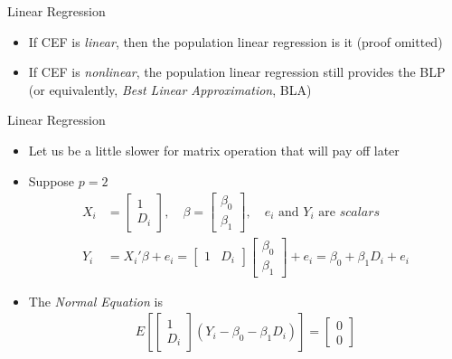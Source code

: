 \documentclass[aspectratio=1610,12pt,xcolor=dvipsnames]{beamer}
\begin{document}
\begin{frame}{Linear Regression}

\begin{itemize}
    \item If CEF is \textit{linear}, then the population linear regression is it (proof omitted)
    \item If CEF is \textit{nonlinear}, the population linear regression still provides the BLP (or equivalently, \textit{Best Linear Approximation}, BLA)
\end{itemize}
    
\end{frame}

\begin{frame}{Linear Regression}
    \begin{itemize}
    \item Let us be a little slower for matrix operation
    that will pay off later
    \item Suppose $p=2$
    \begin{align*}
        X_i &=
    \begin{bmatrix}
    1 \\
    D_{i}
    \end{bmatrix}, \quad
    \beta =
    \begin{bmatrix}
    \beta_0 \\
    \beta_1
    \end{bmatrix}, \quad e_i \text{ and } Y_i \text{ are } \textit{scalars} \\
    Y_i &= X_i'\beta + e_i = \begin{bmatrix}
    1 & D_{i}
    \end{bmatrix} \begin{bmatrix}
    \beta_0 \\
    \beta_1
    \end{bmatrix} + e_i = \beta_0 + \beta_1D_i + e_i
    \end{align*}
    \item The \textit{Normal Equation} is
    \begin{align*}
        E\left[\begin{bmatrix}
    1 \\ D_{i}
    \end{bmatrix}(Y_i - \beta_0 - \beta_1D_i)\right] = \begin{bmatrix}
    0 \\
    0
    \end{bmatrix}
    \end{align*}
    \end{itemize}
\end{frame}
\end{document}
